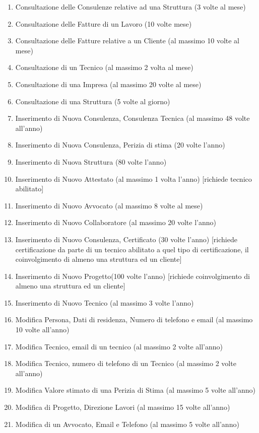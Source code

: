 \documentclass{elegantbook}
\begin{document}
\begin{enumerate}
		\item Consultazione delle Consulenze relative ad una Struttura (3 volte al mese)
		\item Consultazione delle Fatture di un Lavoro (10 volte mese)
		\item Consultazione delle Fatture relative a un Cliente (al massimo 10 volte al mese)
		\item Consultazione di un Tecnico (al massimo 2 volta al mese)
		\item Consultazione di una Impresa (al massimo 20 volte al mese)
		\item Consultazione di una Struttura (5 volte al giorno)
		\item Inserimento di Nuova Consulenza, Consulenza Tecnica (al massimo 48 volte all'anno)
		\item Inserimento di Nuova Consulenza, Perizia di stima (20 volte l'anno)
		\item Inserimento di Nuova Struttura (80 volte l'anno)
		\item Inserimento di Nuovo Attestato (al massimo 1 volta l'anno) [richiede tecnico abilitato]
		\item Inserimento di Nuovo Avvocato (al massimo 8 volte al mese)
		\item Inserimento di Nuovo Collaboratore (al massimo 20 volte l'anno)
		\item Inserimento di Nuovo Consulenza, Certificato (30 volte l'anno) [richiede certificazione da parte di un tecnico abilitato a quel tipo di certificazione, il coinvolgimento di almeno una struttura ed un cliente]
		\item Inserimento di Nuovo Progetto(100 volte l'anno) [richiede coinvolgimento di almeno una struttura ed un cliente]
		\item Inserimento di Nuovo Tecnico (al massimo 3 volte l'anno)
		\item Modifica Persona, Dati di residenza, Numero di telefono e email (al massimo 10 volte all'anno)
		\item Modifica Tecnico, email di un tecnico (al massimo 2 volte all'anno)
		\item Modifica Tecnico, numero di telefono di un Tecnico (al massimo 2 volte all'anno)
		\item Modifica Valore stimato di una Perizia di Stima (al massimo 5 volte all'anno)
		\item Modifica di Progetto, Direzione Lavori (al massimo 15 volte all'anno)
		\item Modifica di un Avvocato, Email e Telefono (al massimo 5 volte all'anno)

\end{enumerate}
\end{document}
